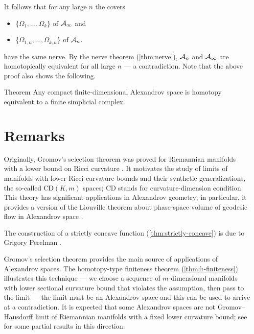It follows that for any large $n$ the covers 
\begin{itemize}
\item $\{\Omega_{1},\dots,\Omega_{k}\}$ of $\mathcal{A}_\infty$ and 
\item $\{\Omega_{1,n},\dots,\Omega_{k,n}\}$ of $\mathcal{A}_n$.
\end{itemize}
have the same nerve.
By the nerve theorem (\ref{thm:nerve}), $\mathcal{A}_n$ and $\mathcal{A}_\infty$ are homotopically equivalent for all large $n$ --- a contradiction.
\qeds
Note that the above proof also shows the following.

\begin{thm}{Theorem}\label{thm:finite-dim-hom-simplicial}
Any compact finite-dimensional Alexandrov space is homotopy equivalent to a finite simplicial complex.
\end{thm}

\section{Remarks}

Originally, Gromov's selection theorem was proved for Riemannian manifolds with a lower bound on Ricci curvature \cite{gromov1981}.
It motivates the study of limits of manifolds with lower Ricci curvature bounds and their synthetic generalizations, the so-called $\mathrm{CD}(K,m)$ spaces; $\mathrm{CD}$ stands for curvature-dimension condition.
This theory has significant applications in Alexandrov geometry;
in particular, it provides a version of the Liouville theorem about phase-space volume of geodesic flow in Alexandrov space \cite{brue-mondino-semola}.

The construction of a strictly concave function (\ref{thm:strictly-concave}) is due to Grigory Perelman \cite{perelman1993,perelman-petrunin}.

Gromov's selection theorem provides the main source of applications of Alexandrov spaces.
The homotopy-type finiteness theorem (\ref{thm:h-finiteness}) illustrates this technique --- we choose a sequence of $m$-dimensional manifolds with lower sectional curvature bound that violates the assumption, 
then pass to the limit --- the limit must be an Alexandrov space and this can be used to arrive at a contradiction.
It is expected that some Alexandrov spaces are not Gromov--Hausdorff limit of Riemannian manifolds with a fixed lower curvature bound; see \cite{kapovitch2005,petersen-wilhelm-zhu} for some partial results in this direction.

